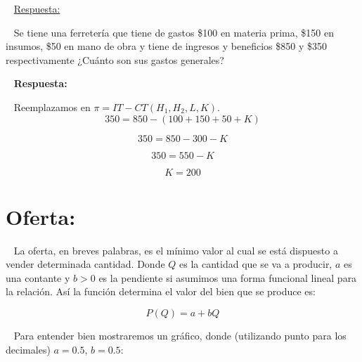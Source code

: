 \documentclass[
  letterpaper,
  DIV=11,
  numbers=noendperiod]{scrreport}
\begin{document}
~ \ul{Respuesta:}

~ Se tiene una ferretería que tiene de gastos \$100 en materia prima,
\$150 en insumos, \$50 en mano de obra y tiene de ingresos y beneficios
\$850 y \$350 respectivamente ¿Cuánto son sus gastos generales?

~ \textbf{Respuesta:}

~ Reemplazamos en \(\pi = IT-CT(H_1,H_2,L,K)\). \[
350 = 850-(100+150+50+K)
\]

\[
350 = 850-300-K
\]

\[
350 = 550-K
\]

\[
K = 200
\]

\hypertarget{oferta}{%
\section{Oferta:}\label{oferta}}

~ La oferta, en breves palabras, es el mínimo valor al cual se está
dispuesto a vender determinada cantidad. Donde \(Q\) es la cantidad que
se va a producir, \(a\) es una contante y \(b>0\) es la pendiente si
asumimos una forma funcional lineal para la relación. Así la función
determina el valor del bien que se produce es:

\[
P(Q)=a+bQ
\]

~ Para entender bien mostraremos un gráfico, donde (utilizando punto
para los decimales) \(a=0.5\), \(b=0.5\):
\end{document}
